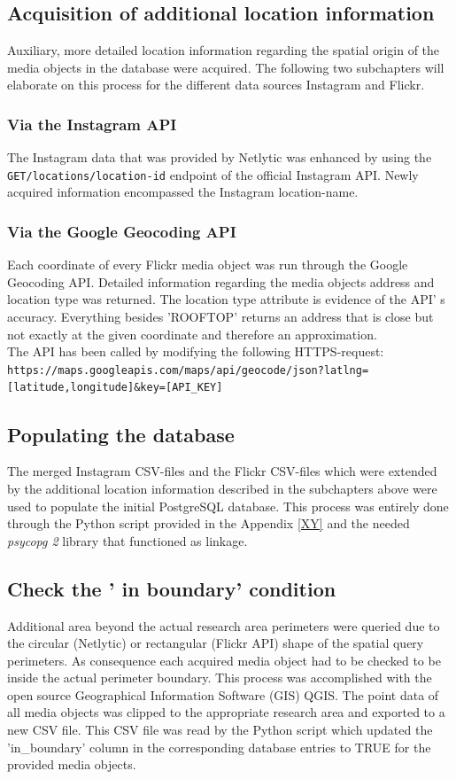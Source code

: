 \subsection{Acquisition of additional location information} \label{add_location_data}
Auxiliary, more detailed location information regarding the spatial origin of the media objects in the database were acquired. The following two subchapters will elaborate on this process for the different data sources Instagram and Flickr.

\subsubsection{Via the Instagram API}
The Instagram data that was provided by Netlytic was enhanced by using the \texttt{GET/locations/location-id} endpoint of the official Instagram API. Newly acquired information encompassed the Instagram location-name.

\subsubsection{Via the Google Geocoding API}
Each coordinate of every Flickr media object was run through the Google Geocoding API. Detailed information regarding the media objects address and location type was returned. The location type attribute is evidence of the API' s accuracy. Everything besides 'ROOFTOP' returns an address that is close but not exactly at the given coordinate and therefore an approximation.\\
The API has been called by modifying the following HTTPS-request:\\
\texttt{https://maps.googleapis.com/maps/api/geocode/json?latlng=[latitude,longitude]\&key=[API\_KEY]}

\subsection{Populating the database} \label{populate_db}
The merged Instagram CSV-files and the Flickr CSV-files which were extended by the additional location information described in the subchapters above were used to populate the initial PostgreSQL database. This process was entirely done through the Python script provided in the Appendix \ref{XY} and the needed \textit{psycopg 2} library that functioned as linkage.

\subsection{Check the ' in boundary' condition} \label{in_boundary}
Additional area beyond the actual research area perimeters were queried due to the circular (Netlytic) or rectangular (Flickr API) shape of the spatial query perimeters. As consequence each acquired media object had to be checked to be inside the actual perimeter boundary. This process was accomplished with the open source Geographical Information Software (GIS) QGIS. The point data of all media objects was clipped to the appropriate research area and exported to a new CSV file. This CSV file was read by the Python script which updated the 'in\_boundary' column in the corresponding database entries to TRUE for the provided media objects.

